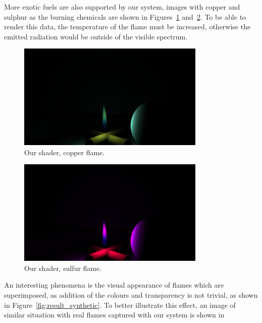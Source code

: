 More exotic fuels are also supported by our system, images with copper and sulphur as the burning chemicals are shown in Figures~\ref{fig:result_copper} and~\ref{fig:result_sulfur}.
To be able to render this data, the temperature of the flame must be increased, otherwise the emitted radiation would be outside of the visible spectrum.

\begin{figure}[htbp]
	\centering
	\includegraphics[width=0.8\textwidth, trim={8cm 0 8cm 10cm}, clip]{img/result_copper}
	\caption{Our shader, copper flame.}
	\label{fig:result_copper}
\end{figure}

\begin{figure}[htbp]
	\centering
	\includegraphics[width=0.8\textwidth, trim={8cm 0 8cm 10cm}, clip]{img/result_sulfur}
	\caption{Our shader, sulfur flame.}
	\label{fig:result_sulfur}
\end{figure}

An interesting phenomena is the visual appearance of flames which are superimposed, as addition of the colours and transparency is not trivial, as shown in Figure~\ref{fig:result_synthetic}.
To better illustrate this effect, an image of similar situation  with real flames captured with our system is shown in 

